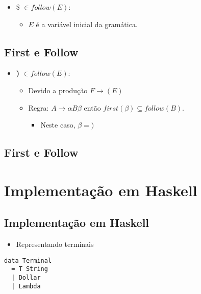 \documentclass[11pt]{article}
\begin{document}
\begin{itemize}
\item \$ \(\in follow(E)\):
\begin{itemize}
\item \(E\) é a variável inicial da gramática.
\end{itemize}
\end{itemize}
\subsection*{First e Follow}
\label{sec:org724fec5}

\begin{itemize}
\item \textbf{)} \(\in follow(E)\):
\begin{itemize}
\item Devido a produção \(F \to (E)\)
\item Regra: \(A \to \alpha B \beta\) então \(first(\beta) \subseteq follow(B)\).
\begin{itemize}
\item Neste caso, \(\beta = \textbf{)}\)
\end{itemize}
\end{itemize}
\end{itemize}
\subsection*{First e Follow}
\label{sec:org875c47c}

\begin{itemize}
\item Logo, temos que \$follow(E) = $\backslash${\textbf{)},$\backslash$\(\}\).
\end{itemize}
\section*{Implementação em Haskell}
\label{sec:org9be93c9}

\subsection*{Implementação em Haskell}
\label{sec:org755d21d}

\begin{itemize}
\item Representando terminais
\end{itemize}

\begin{verbatim}
data Terminal
  = T String
  | Dollar
  | Lambda
\end{verbatim}
\end{document}
